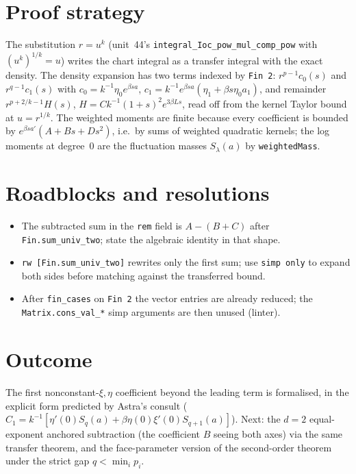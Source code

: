 \documentclass[11pt]{article}
\begin{document}
\section{Proof strategy}
The substitution $r=u^k$ (unit~44's \texttt{integral\_Ioc\_pow\_mul\_comp\_pow} with
$(u^k)^{1/k}=u$) writes the chart integral as a transfer integral with the exact density. The
density expansion has two terms indexed by \texttt{Fin 2}: $r^{p-1}c_0(s)$ and $r^{q-1}c_1(s)$ with
$c_0=k^{-1}\eta_0e^{\beta sa}$, $c_1=k^{-1}e^{\beta sa}(\eta_1+\beta s\eta_0a_1)$, and remainder
$r^{p+2/k-1}H(s)$, $H=Ck^{-1}(1+s)^2e^{3\beta Ls}$, read off from the kernel Taylor bound at
$u=r^{1/k}$. The weighted moments are finite because every coefficient is bounded by
$e^{\beta sa'}(A+Bs+Ds^2)$, i.e.\ by sums of weighted quadratic kernels; the log moments at degree~0
are the fluctuation masses $S_\lambda(a)$ by \texttt{weightedMass}.

\section{Roadblocks and resolutions}
\begin{itemize}
\item The subtracted sum in the \texttt{rem} field is $A-(B+C)$ after \texttt{Fin.sum\_univ\_two};
state the algebraic identity in that shape.
\item \texttt{rw [Fin.sum\_univ\_two]} rewrites only the first sum; use \texttt{simp only} to expand
both sides before matching against the transferred bound.
\item After \texttt{fin\_cases} on \texttt{Fin 2} the vector entries are already reduced; the
\texttt{Matrix.cons\_val\_*} simp arguments are then unused (linter).
\end{itemize}

\section{Outcome}
The first nonconstant-$\xi,\eta$ coefficient beyond the leading term is formalised, in the explicit
form predicted by Astra's consult ($C_1=k^{-1}[\eta'(0)S_q(a)+\beta\eta(0)\xi'(0)S_{q+1}(a)]$).
Next: the $d=2$ equal-exponent anchored subtraction (the coefficient $B$ seeing both axes) via the same
transfer theorem, and the face-parameter version of the second-order theorem under the strict gap
$q<\min_ip_i$.
\end{document}
